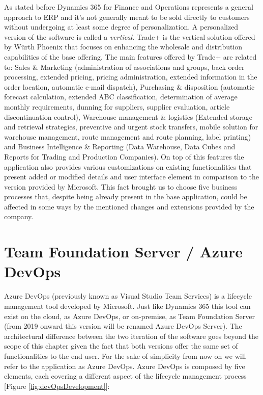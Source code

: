 As stated before Dynamics 365 for Finance and Operations represents a general approach to ERP and it's not generally meant to be sold directly to customers without undergoing at least some degree of personalization. A personalized version of the software is called a \textit{vertical}. Trade+ is the vertical solution offered by Würth Phoenix that focuses on enhancing the wholesale and distribution capabilities of the base offering. The main features offered by Trade+ are related to: 
Sales \& Marketing (administration of associations and groups, back order processing, extended pricing, pricing administration, extended information in the order location, automatic e-mail dispatch), Purchasing \& disposition (automatic forecast calculation, extended ABC classification, determination of average monthly requirements, dunning for suppliers, supplier evaluation, article discontinuation control), Warehouse management \& logistics (Extended storage and retrieval strategies, preventive and urgent stock transfers, mobile solution for warehouse management, route management and route planning, label printing) and Business Intelligence \& Reporting (Data Warehouse, Data Cubes and Reports for Trading and Production Companies).
On top of this features the application also provides various customizations on existing functionalities that present added or modified details and user interface element in comparison to the version provided by Microsoft. This fact brought us to choose five business processes that, despite being already present in the base application, could be affected in some ways by the mentioned changes and extensions provided by the company.

\section{Team Foundation Server / Azure DevOps} 

Azure DevOps \cite{DevOps} (previously known as Visual Studio Team Services) is a lifecycle management tool developed by Microsoft. Just like Dynamics 365 this tool can exist on the cloud, as Azure DevOps, or on-premise, as Team Foundation Server (from 2019 onward this version will be renamed Azure DevOps Server). The architectural difference between the two iteration of the software goes beyond the scope of this chapter given the fact that both versions offer the same set of functionalities to the end user. For the sake of simplicity from now on we will refer to the application as Azure DevOps. Azure DevOps is composed by five elements, each covering a different aspect of the lifecycle management process [Figure \ref{fig:devOpsDevelopment}]:

